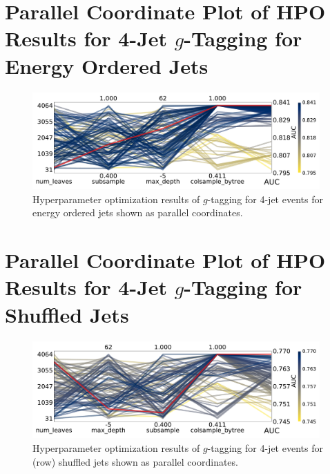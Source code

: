 \FloatBarrier
\section[Parallel Coordinate Plot of HPO Results for 4-Jet g-Tagging for Energy Ordered Jets]{Parallel Coordinate Plot of HPO Results for 4-Jet $g$-Tagging for Energy Ordered Jets}
\begin{figure}[h!]
  \includegraphics[width=0.98\textwidth, trim=0 0 0 0, clip]{figures/quarks/CV_viz-njet=4-name=lf_gtag_energy_ordered_lgb_down_sample=1.00-ML_vars=vertex-selection=b-ejet_min=4-n_iter_RS_lgb=99-n_iter_RS_xgb=9-cdot_cut=0.90-version=19.pdf}
  \caption[Parallel Coordinate Plot of HPO Results for 4-Jet $g$-Tagging for Energy Ordered Jets]
          {Hyperparameter optimization results of $g$-tagging for 4-jet events for energy ordered jets shown as parallel coordinates. 
          } 
  \label{fig:q:CV_res_parallel_coords_g_tag_4j_energy_ordered}
\end{figure}
\vspace{3cm}
\section[Parallel Coordinate Plot of HPO Results for 4-Jet g-Tagging for Shuffled Jets]{Parallel Coordinate Plot of HPO Results for 4-Jet $g$-Tagging for Shuffled Jets}
\begin{figure}[h!]
  \includegraphics[width=0.98\textwidth, trim=0 0 0 0, clip]{figures/quarks/CV_viz-njet=4-name=lf_gtag_shuffled_lgb_down_sample=1.00-ML_vars=vertex-selection=b-ejet_min=4-n_iter_RS_lgb=99-n_iter_RS_xgb=9-cdot_cut=0.90-version=19.pdf}
  \caption[Parallel Coordinate Plot of HPO Results for 4-Jet $g$-Tagging for Shuffled Jets]
          {Hyperparameter optimization results of $g$-tagging for 4-jet events for (row) shuffled jets shown as parallel coordinates. 
          } 
  \label{fig:q:CV_res_parallel_coords_g_tag_4j_shuffled}
\end{figure}
\clearpage



